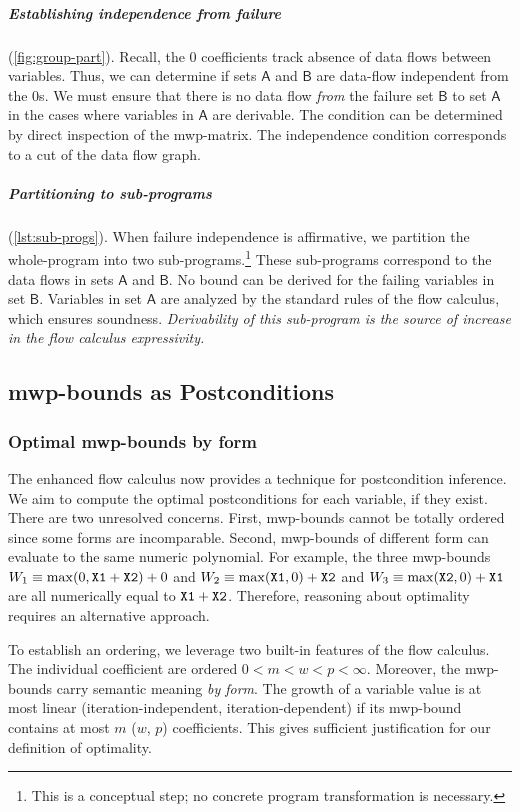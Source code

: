 \subparagraph*{Establishing independence from failure} (\autoref{fig:group-part}).
Recall, the \(0\) coefficients track {absence} of data flows between variables.
Thus, we can determine if sets \(\mathsf{A}\) and \(\mathsf{B}\) are data-flow independent from the \(0\)s.
We must ensure that there is no data flow \emph{from} the failure set \(\mathsf{B}\) to set \(\mathsf{A}\) in the cases where variables in \(\mathsf{A}\) are derivable.
The condition can be determined by direct inspection of the mwp-matrix.
The independence condition corresponds to a cut of the data flow graph.

\subparagraph*{Partitioning to sub-programs} (\autoref{lst:sub-progs}).
When failure independence is affirmative, we {partition} the whole-program into two sub-programs.\footnote{
    This is a conceptual step; no concrete program transformation is necessary.}
These sub-programs correspond to the data flows in sets \(\mathsf{A}\) and \(\mathsf{B}\).
No bound can be derived for the failing variables in set \(\mathsf{B}\).
Variables in set \(\mathsf{A}\) are analyzed by the standard rules of the flow calculus, which ensures soundness.
\emph{Derivability of this sub-program is the source of increase in the flow calculus expressivity.}

\subsection{mwp-bounds as Postconditions}
\label{sec:analysis}

\subsubsection{Optimal mwp-bounds by form}
\label{subsec:categories}

The enhanced flow calculus now provides a technique for postcondition inference.
We aim to compute the optimal postconditions for each variable, if they exist.
There are two unresolved concerns.
First, mwp-bounds cannot be totally ordered since some forms are incomparable.
Second, mwp-bounds of different form can evaluate to the same numeric polynomial.
For example, the three mwp-bounds
\(W_1 \equiv \max(0,\prm{X1}+\prm{X2})+0\) and
\(W_2 \equiv \max(\prm{X1},0)+\prm{X2}\) and
\(W_3 \equiv \max(\prm{X2},0)+\prm{X1}\) are all numerically equal to \(\prm{X1}+\prm{X2}\).
Therefore, reasoning about optimality requires an alternative approach.

To establish an ordering, we leverage two built-in features of the flow calculus.
The individual coefficient are ordered \(0 < m < w < p < \infty\).
Moreover, the mwp-bounds carry semantic meaning \emph{by form}.
The growth of a variable value is at most {linear} (\resp iteration-independent, iteration-dependent)
if its mwp-bound contains at most \(m\) (\resp \(w\), \(p\)) coefficients.
This gives sufficient justification for our definition of optimality.

